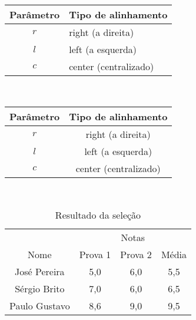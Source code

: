 \documentclass[12pt,a4paper]{article}
\begin{document}
\begin{tabular}{c | l}
    Parâmetro & Tipo de alinhamento   \\ \hline
     $r$      &  right (a direita)    \\
     $l$      &  left (a esquerda)    \\
     $c$      & center (centralizado) \\ \hline
\end{tabular} \\ \vspace{0.5cm}

\begin{tabular}{|c|c|}
    \hline
     Parâmetro & Tipo de alinhamento   \\ \hline
     $r$      &  right (a direita)    \\
     $l$      &  left (a esquerda)    \\
     $c$      & center (centralizado) \\ \hline
\end{tabular} \\ \vspace{0.5cm}

\begin{table}[h]
    \centering
    \begin{tabular}{| c | c | c | c |}
         \hline
                       & \multicolumn{3}{c|}{Notas} \\
                        \cline{2-4}    %
             Nome      & Prova 1 &  Prova 2 & Média \\
        \hline
         José Pereira  &  5,0    &    6,0   &  5,5  \\
         Sérgio Brito  &  7,0    &    6,0   &  6,5  \\
         Paulo Gustavo &  8,6    &    9,0   &  9,5  \\
        \hline
    \end{tabular}
    \caption{Resultado da seleção}
    \label{tab:my_label}
\end{table}
\end{document}
